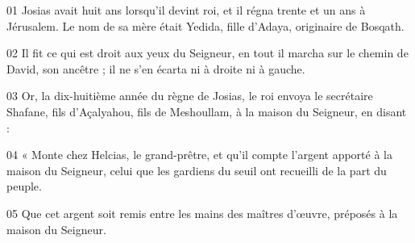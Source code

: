 01 Josias avait huit ans lorsqu’il devint roi, et il régna trente et un ans à Jérusalem. Le nom de sa mère était Yedida, fille d’Adaya, originaire de Bosqath.

02 Il fit ce qui est droit aux yeux du Seigneur, en tout il marcha sur le chemin de David, son ancêtre ; il ne s’en écarta ni à droite ni à gauche.

03 Or, la dix-huitième année du règne de Josias, le roi envoya le secrétaire Shafane, fils d’Açalyahou, fils de Meshoullam, à la maison du Seigneur, en disant :

04 « Monte chez Helcias, le grand-prêtre, et qu’il compte l’argent apporté à la maison du Seigneur, celui que les gardiens du seuil ont recueilli de la part du peuple.

05 Que cet argent soit remis entre les mains des maîtres d’œuvre, préposés à la maison du Seigneur.